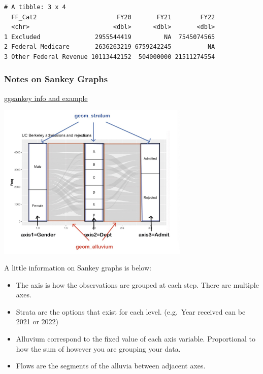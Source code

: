 \documentclass[
  letterpaper,
  DIV=11,
  numbers=noendperiod]{scrreport}
\providecommand{\tightlist}{%
  \setlength{\itemsep}{0pt}\setlength{\parskip}{0pt}}\usepackage{longtable,booktabs,array}
\begin{document}
\begin{verbatim}
# A tibble: 3 x 4
  FF_Cat2                      FY20       FY21        FY22
  <chr>                       <dbl>      <dbl>       <dbl>
1 Excluded               2955544419         NA  7545074565
2 Federal Medicare       2636263219 6759242245          NA
3 Other Federal Revenue 10113442152  504000000 21511274554
\end{verbatim}

\hypertarget{notes-on-sankey-graphs}{%
\subsubsection{Notes on Sankey Graphs}\label{notes-on-sankey-graphs}}

\href{https://cheatography.com/seleven/cheat-sheets/ggalluvial/}{ggsankey
info and example}

\includegraphics[width=3.60417in,height=\textheight]{./images/image-2109120559.png}

A little information on Sankey graphs is below:

\begin{itemize}
\tightlist
\item
  The axis is how the observations are grouped at each step. There are
  multiple axes.
\item
  Strata are the options that exist for each level. (e.g.~Year received
  can be 2021 or 2022)
\item
  Alluvium correspond to the fixed value of each axis variable.
  Proportional to how the sum of however you are grouping your data.
\item
  Flows are the segments of the alluvia between adjacent axes.
\end{itemize}

\end{document}
